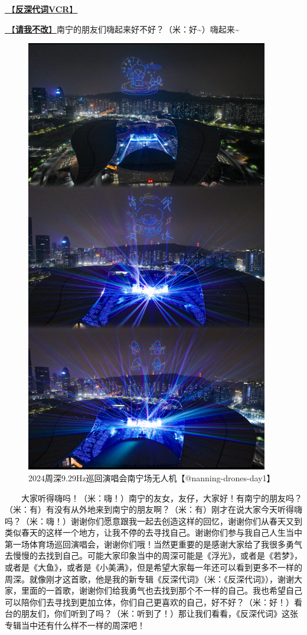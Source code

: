\documentclass[]{ctexbook}
\begin{document}
\hyperref[senself-vcr]{🎥【\textbf{反深代词VCR}】}

\hyperref[brave-heart]{🎵【\textbf{请我不改}】}南宁的朋友们嗨起来好不好？（米：好\textasciitilde）嗨起来\textasciitilde{}

\begin{figure}

{\centering \includegraphics[width=300pt]{img/nanning20241206/001} 

}

\caption{2024周深9.29Hz巡回演唱会南宁场无人机【@nanning-drones-day1】}\label{fig:unnamed-chunk-153}
\end{figure}

  大家听得嗨吗！（米：嗨！）南宁的友女，友仔，大家好！有南宁的朋友吗？（米：有）有没有从外地来到南宁的朋友啊？（米：有）刚才在说大家今天听得嗨吗？（米：嗨！）谢谢你们愿意跟我一起去创造这样的回忆，谢谢你们从春天又到类似春天的这样一个地方，让我不停的去寻找自己。谢谢你们参与我自己人生当中第一场体育场巡回演唱会，谢谢你们哦！当然更重要的是感谢大家给了我很多勇气去慢慢的去找到自己。可能大家印象当中的周深可能是《浮光》，或者是《若梦》，或者是《大鱼》，或者是《小美满》，但是希望大家每一年还可以看到更多不一样的周深。就像刚才这首歌，他是我的新专辑《反深代词》（米：《反深代词》），谢谢大家，里面的一首歌，谢谢你们给我勇气也去找到那个不一样的自己。我也希望自己可以陪你们去寻找到更加立体，你们自己更喜欢的自己，好不好？（米：好！）看台的朋友们，你们听到了吗？（米：听到了！）那让我们看看，《反深代词》这张专辑当中还有什么样不一样的周深吧！
\end{document}
